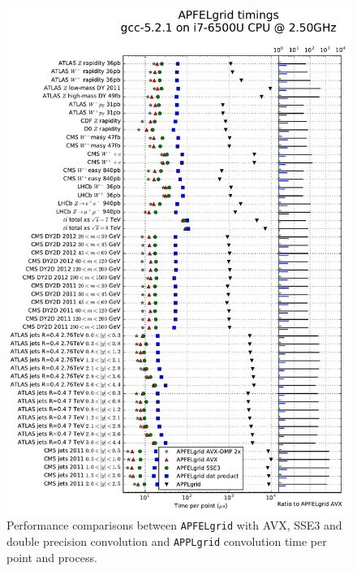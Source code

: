 \documentclass[preprint,12pt]{elsarticle}
\begin{document}
\begin{figure}[p]
  \centering
  \includegraphics[scale=0.6]{plots/t0a}
\caption{\small Performance comparisons between {\tt APFELgrid} with
  AVX, SSE3 and double precision convolution and {\tt APPLgrid}
  convolution time per point and process.}
\label{fig:benchmark}
\end{figure}
\end{document}
